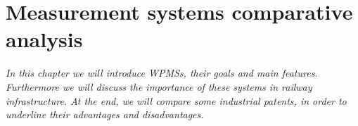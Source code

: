 \chapter{Measurement systems comparative analysis}
\label{ch:sys_cmp}
%
%
\textit{In this chapter we will introduce \acs{WPMS}s, their goals and main features. Furthermore we will discuss the importance of these systems in railway infrastructure. At the end, we will compare some industrial patents, in order to underline their advantages and disadvantages.}

  

  